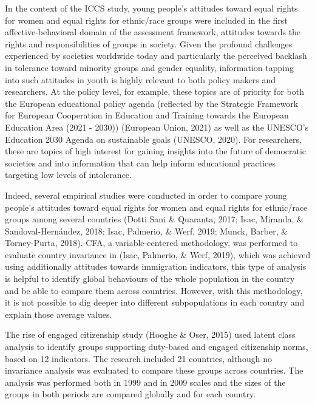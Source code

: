 \documentclass[12pt,a4paper,oneside]{reedthesis}
\begin{document}
In the context of the ICCS study, young people's attitudes toward equal rights for women and equal rights for ethnic/race groups were included in the first affective-behavioral domain of the assessment framework, attitudes towards the rights and responsibilities of groups in society. Given the profound challenges experienced by societies worldwide today and particularly the perceived backlash in tolerance toward minority groups and gender equality, information tapping into such attitudes in youth is highly relevant to both policy makers and researchers. At the policy level, for example, these topics are of priority for both the European educational policy agenda (reflected by the Strategic Framework for European Cooperation in Education and Training towards the European Education Area (2021 - 2030)) (European Union, 2021) as well as the UNESCO's Education 2030 Agenda on sustainable goals (UNESCO, 2020). For researchers, these are topics of high interest for gaining insights into the future of democratic societies and into information that can help inform educational practices targeting low levels of intolerance.

Indeed, several empirical studies were conducted in order to compare young people's attitudes toward equal rights for women and equal rights for ethnic/race groups among several countries (Dotti Sani \& Quaranta, 2017; Isac, Miranda, \& Sandoval-Hernández, 2018; Isac, Palmerio, \& Werf, 2019; Munck, Barber, \& Torney-Purta, 2018). CFA, a variable-centered methodology, was performed to evaluate country invariance in (Isac, Palmerio, \& Werf, 2019), which was achieved using additionally attitudes towards immigration indicators, this type of analysis is helpful to identify global behaviours of the whole population in the country and be able to compare them across countries. However, with this methodology, it is not possible to dig deeper into different subpopulations in each country and explain those average values.

The rise of engaged citizenship study (Hooghe \& Oser, 2015) used latent class analysis to identify groups supporting duty-based and engaged citizenship norms, based on 12 indicators. The research included 21 countries, although no invariance analysis was evaluated to compare these groups across countries. The analysis was performed both in 1999 and in 2009 scales and the sizes of the groups in both periods are compared globally and for each country.
\end{document}
